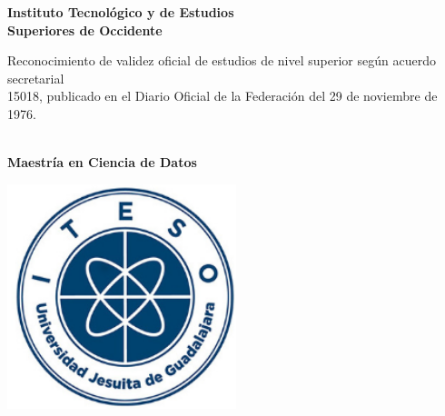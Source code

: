 \begin{titlepage}
\begin{fullwidth}
    \begin{center}
        \huge
        \textcolor{itesodblue}{\textbf{Instituto Tecnol\'ogico y de Estudios \\ Superiores de Occidente}}\\
        
        \vspace*{0.1cm}
        
        \normalsize
        \textcolor{itesodblue}{Reconocimiento de validez oficial de estudios de nivel superior según acuerdo secretarial \\15018, publicado en el Diario Oficial de la Federación del 29 de noviembre de 1976.}\\
        
        \vspace*{0.5cm}
        
        \LARGE
        \textcolor{itesodblue}{\mydepartament}\\
        \textcolor{itesodblue}{\textbf{Maestría en Ciencia de Datos}}
        
        \vspace*{1cm}
        
        \includegraphics[width=0.5\textwidth]{files/iteso_logo.png}
        
        \vspace*{1cm}
        
        \LARGE
        \textcolor{itesodblue}{\textbf{\mytitle}}
        

\end{center}
\end{fullwidth}
\end{titlepage}
